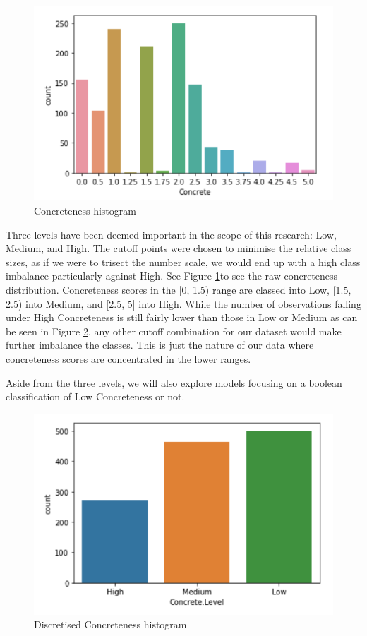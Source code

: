 \documentclass[12pt, a4paper]{article}
\begin{document}
\begin{figure}[ht]
\centerline{\includegraphics[scale=0.8]{concreteness_distribution.png}}
\caption{Concreteness histogram}
\label{concreteness_distribution}
\end{figure}
 
Three levels have been deemed important in the scope of this research: Low, Medium, and High. The cutoff points were chosen to minimise the relative class sizes, as if we were to trisect the number scale, we would end up with a high class imbalance particularly against High. See Figure \ref{concreteness_distribution}to see the raw concreteness distribution. Concreteness scores in the [0, 1.5) range are classed into Low, [1.5, 2.5) into Medium, and [2.5, 5] into High. While the number of observations falling under High Concreteness is still fairly lower than those in Low or Medium as can be seen in Figure \ref{concreteness_discrete_distribution}, any other cutoff combination for our dataset would make further imbalance the classes. This is just the nature of our data where concreteness scores are concentrated in the lower ranges.

Aside from the three levels, we will also explore models focusing on a boolean classification of Low Concreteness or not. 

\begin{figure}
\centerline{\includegraphics[scale=0.8]{concreteness_discrete_distribution.png}}
\caption{Discretised Concreteness histogram}
\label{concreteness_discrete_distribution}
\end{figure}
\end{document}
